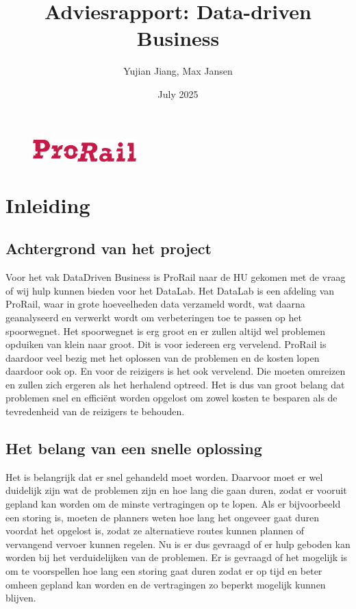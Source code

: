 \documentclass{article}
\title{Adviesrapport: Data-driven Business}
\author{Yujian Jiang, Max Jansen}
\date{July 2025}
\begin{document}
\maketitle

\begin{figure}
    \centering
    \includegraphics[width=4cm]{prorail.png}
\end{figure}

\pagestyle{fancy}

\newpage
\tableofcontents

\newpage
\section{Inleiding}

\subsection{Achtergrond van het project}
Voor het vak DataDriven Business is ProRail naar de HU gekomen met de vraag of wij hulp kunnen bieden voor het DataLab. Het DataLab is een afdeling van ProRail, waar in grote hoeveelheden data verzameld wordt, wat daarna geanalyseerd en verwerkt wordt om verbeteringen toe te passen op het spoorwegnet. Het spoorwegnet is erg groot en er zullen altijd wel problemen opduiken van klein naar groot. Dit is voor iedereen erg vervelend. ProRail is daardoor veel bezig met het oplossen van de problemen en de kosten lopen daardoor ook op. En voor de reizigers is het ook vervelend. Die moeten omreizen en zullen zich ergeren als het herhalend optreed. Het is dus van groot belang dat problemen snel en efficiënt worden opgelost om zowel kosten te besparen als de tevredenheid van de reizigers te behouden.

\subsection{Het belang van een snelle oplossing}
Het is belangrijk dat er snel gehandeld moet worden. Daarvoor moet er wel duidelijk zijn wat de problemen zijn en hoe lang die gaan duren, zodat er vooruit gepland kan worden om de minste vertragingen op te lopen. Als er bijvoorbeeld een storing is, moeten de planners weten hoe lang het ongeveer gaat duren voordat het opgelost is, zodat ze alternatieve routes kunnen plannen of vervangend vervoer kunnen regelen. Nu is er dus gevraagd of er hulp geboden kan worden bij het verduidelijken van de problemen. Er is gevraagd of het mogelijk is om te voorspellen hoe lang een storing gaat duren zodat er op tijd en beter omheen gepland kan worden en de vertragingen zo beperkt mogelijk kunnen blijven.
\end{document}

